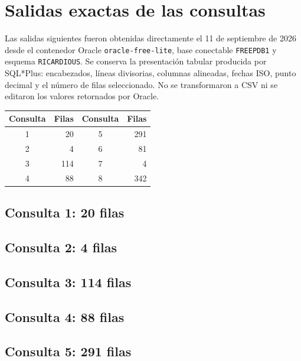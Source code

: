 \documentclass[10pt,letterpaper]{article}
\begin{document}
\clearpage
\appendix
\section{Salidas exactas de las consultas}
Las salidas siguientes fueron obtenidas directamente el 11 de septiembre de 2026 desde el contenedor Oracle \texttt{oracle-free-lite}, base conectable \texttt{FREEPDB1} y esquema \texttt{RICARDIOUS}. Se conserva la presentación tabular producida por SQL*Plus: encabezados, líneas divisorias, columnas alineadas, fechas ISO, punto decimal y el número de filas seleccionado. No se transformaron a CSV ni se editaron los valores retornados por Oracle.

\begin{center}
\begin{tabular}{cr@{\qquad}cr}\toprule
Consulta&Filas&Consulta&Filas\\\midrule
1&20&5&291\\
2&4&6&81\\
3&114&7&4\\
4&88&8&342\\\bottomrule
\end{tabular}
\end{center}

\subsection{Consulta 1: 20 filas}


\subsection{Consulta 2: 4 filas}


\subsection{Consulta 3: 114 filas}


\subsection{Consulta 4: 88 filas}


\subsection{Consulta 5: 291 filas}

\end{document}
